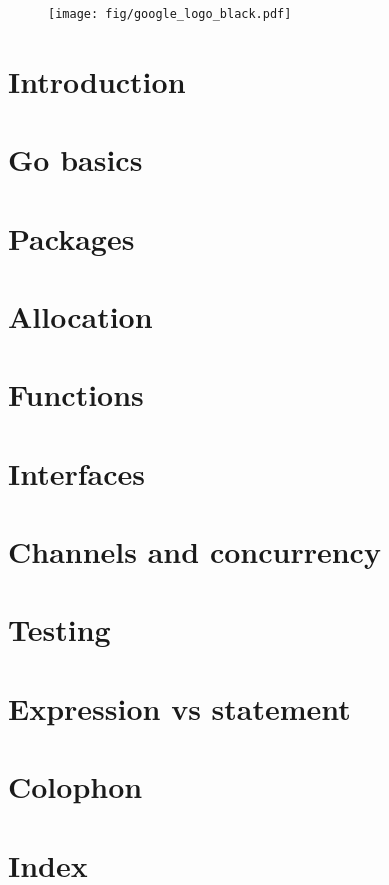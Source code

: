 \documentclass[a4paper,twoside]{blocksbook}
\begin{document}
\clearpage
\thispagestyle{empty}
\begin{figure}
\begin{center}
\texttt{[image: fig/google\_logo\_black.pdf]}
\end{center}
\end{figure}

\chapter{Introduction}
\label{chap:intro}


\chapter{Go basics}
\label{chap:basics}


\chapter{Packages}
\label{chap:packages}


\chapter{Allocation}
\label{chap:allocation}


\chapter{Functions}
\label{chap:functions}


\chapter{Interfaces}
\label{chap:interfaces}


\chapter{Channels and concurrency}
\label{chap:channels}


\chapter{Testing}
\label{chap:testing}

\appendix
\chapter{Expression vs statement}


\chapter{Colophon}


\chapter{Index}
\printindex


\end{document}
